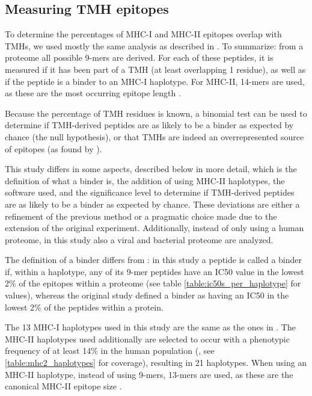 \subsection{Measuring TMH epitopes}

To determine the percentages of MHC-I and MHC-II epitopes overlap
with TMHs, we used mostly the same analysis as described in \cite{bianchi2017}.
To summarize: from a proteome all possible 9-mers are derived. For each
of these peptides, it is measured if it has been part of a 
TMH (at least overlapping 1 residue), 
as well as if the peptide is a binder to an MHC-I haplotype.
For MHC-II, 14-mers are used, as these are the most occurring
epitope length \cite{bergseng2015different}.

Because the percentage of TMH residues is known, a binomial test can be
used to determine if TMH-derived peptides are as likely to be a binder
as expected by chance (the null hypothesis), or that TMHs are indeed an
overrepresented source of epitopes (as found by \cite{bianchi2017}).

This study differs in some aspects, described below in more detail,
which is the definition of what a binder is,
the addition of using MHC-II haplotypes, the software used,
and the significance level to determine if TMH-derived peptides are as 
likely to be a binder as expected by chance.
These deviations are either a refinement of the previous method or
a pragmatic choice made due to the extension of the original experiment.
Additionally, instead of only using a human proteome, in this study
also a viral and bacterial proteome are analyzed.

The definition of a binder differs from \cite{bianchi2017}:
in this study a peptide is called a binder if, within a haplotype, 
any of its 9-mer peptides have an IC50 value in the lowest 2\% of 
the epitopes within a proteome (see table \ref{table:ic50s_per_haplotype} for values), 
whereas the original study defined
a binder as having an IC50 in the lowest 2\% of the peptides within a protein.

The 13 MHC-I haplotypes used in this study are the same as 
the ones in \cite{bianchi2017}.
The MHC-II haplotypes used additionally are selected 
to occur with a phenotypic frequency of at least 
14\% in
the human population (\cite{greenbaum2011functional},
see \ref{table:mhc2_haplotypes} for coverage),
resulting in 21 haplotypes.
When using an MHC-II haplotype, instead of using 9-mers, 13-mers are
used, as these are the canonical MHC-II epitope size .

